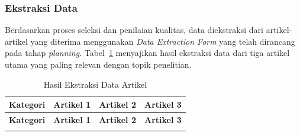 \subsubsection{Ekstraksi Data}

Berdasarkan proses seleksi dan penilaian kualitas, data diekstraksi dari artikel-artikel yang diterima menggunakan \textit{Data Extraction Form} yang telah dirancang pada tahap \textit{planning}. Tabel~\ref{tab:data_extraction} menyajikan hasil ekstraksi data dari tiga artikel utama yang paling relevan dengan topik penelitian.

\begin{longtable}{|p{3.5cm}|p{3.5cm}|p{3.5cm}|p{3.5cm}|}
\caption{Hasil Ekstraksi Data Artikel} \label{tab:data_extraction} \\
\hline
\textbf{Kategori} & \textbf{Artikel 1} \newline \cite{garcia2025} & \textbf{Artikel 2} \newline \cite{aipowered2025} & \textbf{Artikel 3} \newline \cite{rachmat2024} \\
\hline
\endfirsthead
\hline
\textbf{Kategori} & \textbf{Artikel 1} \newline \cite{garcia2025} & \textbf{Artikel 2} \newline \cite{aipowered2025} & \textbf{Artikel 3} \newline \cite{rachmat2024} \\
\hline
\endhead
\hline
\endfoot


\end{longtable}
